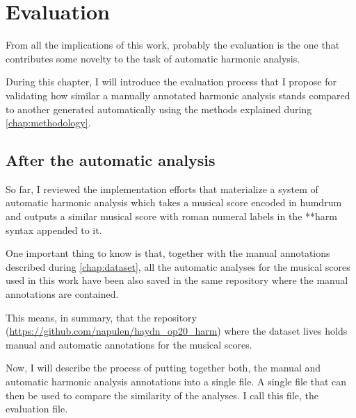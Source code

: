 \chapter{Evaluation}
\label{chap:evaluation}
From all the implications of this work, probably the evaluation is the one that contributes some novelty to the task of automatic harmonic analysis.


During this chapter, I will introduce the evaluation process that I propose for validating how similar a manually annotated harmonic analysis stands compared to another generated automatically using the methods explained during \autoref{chap:methodology}.

\section{After the automatic analysis}
So far, I reviewed the implementation efforts that materialize a system of automatic harmonic analysis which takes a musical score encoded in humdrum and outputs a similar musical score with roman numeral labels in the **harm syntax appended to it.

One important thing to know is that, together with the manual annotations described during \autoref{chap:dataset}, all the automatic analyses for the musical scores used in this work have been also saved in the same repository where the manual annotations are contained.

This means, in summary, that the repository (\url{https://github.com/napulen/haydn_op20_harm}) where the dataset lives holds manual and automatic annotations for the musical scores.

Now, I will describe the process of putting together both, the manual and automatic harmonic analysis annotations into a single file. A single file that can then be used to compare the similarity of the analyses. I call this file, the evaluation file.

